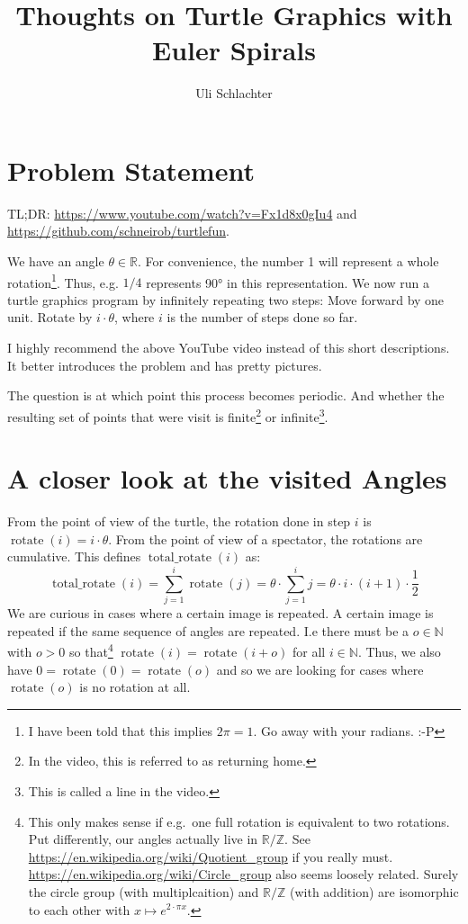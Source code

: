 \documentclass[pdftex,a4paper]{scrartcl}
\title{Thoughts on Turtle Graphics with Euler Spirals}
\author{Uli Schlachter}
\DeclareMathOperator{\rotate}{rotate}
\DeclareMathOperator{\total}{total\_rotate}
\begin{document}
\maketitle

\section{Problem Statement}
TL;DR: \url{https://www.youtube.com/watch?v=Fx1d8x0gIu4} and \url{https://github.com/schneirob/turtlefun}.

We have an angle \(\theta\in\mathbb{R}\). For convenience, the number 1 will represent a whole rotation\footnote{I have
been told that this implies \(2\pi = 1\). Go away with your radians. :-P}. Thus, e.g. \(1/4\) represents 90° in this
representation. We now run a turtle graphics program by infinitely repeating two steps: Move forward by one unit. Rotate
by \(i\cdot\theta\), where \(i\) is the number of steps done so far.

I highly recommend the above YouTube video instead of this short descriptions. It better introduces the problem and has
pretty pictures.

The question is at which point this process becomes periodic. And whether the resulting set of points that were visit is
finite\footnote{In the video, this is referred to as returning home.} or infinite\footnote{This is called a line in the
video.}.

\section{A closer look at the visited Angles}
From the point of view of the turtle, the rotation done in step \(i\) is \(\rotate(i)=i\cdot\theta\). From the point of
view of a spectator, the rotations are cumulative. This defines \(\total(i)\) as:
\[
\total(i)=\sum_{j=1}^i \rotate(j) = \theta\cdot\sum_{j=1}^i j = \theta\cdot i\cdot(i+1)\cdot\frac{1}{2}
\]
We are curious in cases where a certain image is repeated. A certain image is repeated if the same sequence of angles
are repeated.
I.e there must be a \(o\in\mathbb{N}\) with \(o>0\) so that\footnote{This only makes sense if e.g.\ one full rotation is
equivalent to two rotations. Put differently, our angles actually live in \(\mathbb{R}/\mathbb{Z}\). See
\url{https://en.wikipedia.org/wiki/Quotient_group} if you really must. \url{https://en.wikipedia.org/wiki/Circle_group}
also seems loosely related. Surely the circle group (with multiplcaition) and \(\mathbb{R}/\mathbb{Z}\) (with addition)
are isomorphic to each other with \(x\mapsto e^{2\cdot\pi x}\).} \(\rotate(i)=\rotate(i+o)\) for all \(i\in\mathbb{N}\). Thus, we also have
\(0=\rotate(0)=\rotate(o)\) and so we are looking for cases where \(\rotate(o)\) is no rotation at all.
\end{document}
